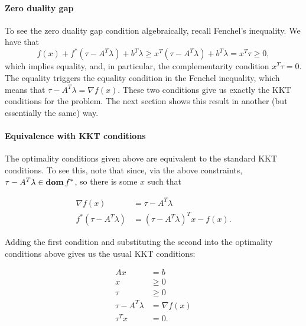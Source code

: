 \documentclass[12pt]{article}
\begin{document}
\paragraph{Zero duality gap}
To see the zero duality gap condition algebraically, recall Fenchel's inequality.
We have that
\[
f(x) + f^*(\tau - A^T \lambda) + b^T\lambda \geq x^T (\tau - A^T \lambda) + b^T\lambda
= x^T \tau \geq 0,
\]
which implies equality, and, in particular, the complementarity condition
$x^T \tau = 0$.
The equality triggers the equality condition in the Fenchel inequality, which
means that $\tau - A^T \lambda = \nabla f(x)$.
These two conditions give us
exactly the KKT conditions for the problem.
The next section shows this result in another (but essentially the same) way.

\paragraph{Equivalence with KKT conditions}
The optimality conditions given above are equivalent to the standard KKT
conditions. To see this, note that since, via the above constraints,
$\tau - A^T \lambda \in \mathop{\bf dom} f^*$, so there is some $x$ such that

\begin{align*}
\nabla f(x) &= \tau - A^T \lambda \\
f^*(\tau - A^T \lambda) &= \left( \tau - A^T \lambda \right)^T x - f(x).
\end{align*}

Adding the first condition and substituting the second into the optimality
conditions above gives us the usual KKT conditions:

\begin{align*}
A x &= b \\
x &\geq 0 \\
\tau &\geq 0 \\
\tau - A^T \lambda &= \nabla f(x)\\
\tau^T x &= 0.
\end{align*}

\end{document}

